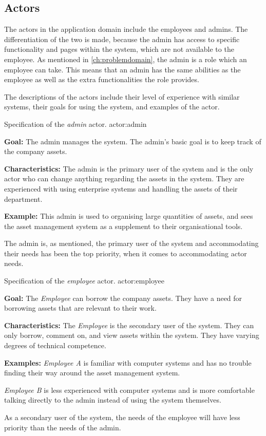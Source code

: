 \subsection{Actors} \label{ssc:actors}
The actors in the application domain include the employees and admins. The differentiation of the two is made, because the admin has access to specific functionality and pages within the system, which are not available to the employee. As mentioned in \autoref{ch:problemdomain}, the admin is a role which an employee can take. This means that an admin has the same abilities as the employee as well as the extra functionalities the role provides.
\par
The descriptions of the actors include their level of experience with similar systems, their goals for using the system, and examples of the actor.

    {Specification of the \textit{admin} actor.}
    {actor:admin}
    {
        \textbf{Goal:} The admin manages the system. The admin's basic goal is to keep track of the company assets.
        \vskip 0.2cm
        
        \textbf{Characteristics:} The admin is the primary user of the system and is the only actor who can change anything regarding the assets in the system. They are experienced with using enterprise systems \citep{EnterpriseSystems} and handling the assets of their department.
        \vskip 0.2cm
        
        \textbf{Example:} This admin is used to organising large quantities of assets, and sees the asset management system as a supplement to their organisational tools.
    }

The admin is, as mentioned, the primary user of the system and accommodating their needs has been the top priority, when it comes to accommodating actor needs.

    {Specification of the \textit{employee} actor.}
    {actor:employee}
    {
        \textbf{Goal:} The \textit{Employee} can borrow the company assets. They have a need for borrowing assets that are relevant to their work.
        \vskip 0.2cm
        
        \textbf{Characteristics:} The \textit{Employee} is the secondary user of the system. They can only borrow, comment on, and view assets within the system. They have varying degrees of technical competence.
        \vskip 0.2cm
        
        \textbf{Examples:} \textit{Employee A} is familiar with computer systems and has no trouble finding their way around the asset management system.
        
        \vskip 0.1cm
        
        \textit{Employee B} is less experienced with computer systems and is more comfortable talking directly to the admin instead of using the system themselves. 
    }
    
As a secondary user of the system, the needs of the employee will have less priority than the needs of the admin.
\newpage